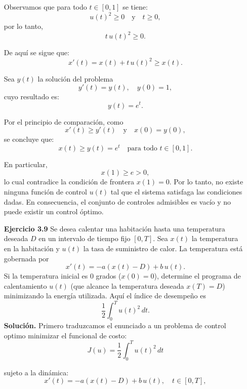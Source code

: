 \documentclass{uofa-eng-assignment}
\begin{document}
\begin{enumerate}
Observamos que para todo \(t \in [0,1]\) se tiene:
\[
u(t)^2 \ge 0 \quad \text{y} \quad t \ge 0,
\]
por lo tanto,
\[
t\,u(t)^2 \ge 0.
\]

De aquí se sigue que:
\[
x'(t)=x(t)+t\,u(t)^2 \ge x(t).
\]

Sea \(y(t)\) la solución del problema
\[
y'(t)=y(t), \quad y(0)=1,
\]
cuyo resultado es:
\[
y(t)=e^t.
\]

Por el principio de comparación, como
\[
x'(t) \ge y'(t) \quad \text{y} \quad x(0)=y(0),
\]
se concluye que:
\[
x(t) \ge y(t)=e^t \quad \text{para todo } t \in [0,1].
\]

En particular,
\[
x(1) \ge e > 0,
\]
lo cual contradice la condición de frontera \(x(1)=0\). Por lo tanto, no existe ninguna función de control \(u(t)\) tal que el sistema satisfaga las condiciones dadas. En consecuencia, el conjunto de controles admisibles es vacío y no puede existir un control óptimo.
\item[\textbf{Ejercicio 3.9}]  Se desea calentar una habitación hasta una temperatura deseada $D$ en un intervalo de tiempo fijo $[0,T]$. Sea $x(t)$ la temperatura en la habitación y $u(t)$ la tasa de suministro de calor. La temperatura está gobernada por
\[
x'(t) = -a(x(t) - D) + b\,u(t).
\]
Si la temperatura inicial es $0$ grados ($x(0) = 0$), determine el programa de calentamiento $u(t)$ (que alcance la temperatura deseada $x(T) = D$) minimizando la energía utilizada. Aquí el índice de desempeño es
\[
\frac{1}{2} \int_{0}^{T} u(t)^2\,dt.
\]
\textbf{Solución.}
Primero traduzcamos el enunciado a un problema de control optimo minimizar el funcional de costo:
\[
J(u)=\frac{1}{2}\int_0^T u(t)^2\,dt
\]

sujeto a la dinámica:
\[
x'(t) = -a(x(t)-D) + b\,u(t), \quad t \in [0,T],
\]


\end{enumerate}
\end{document}
